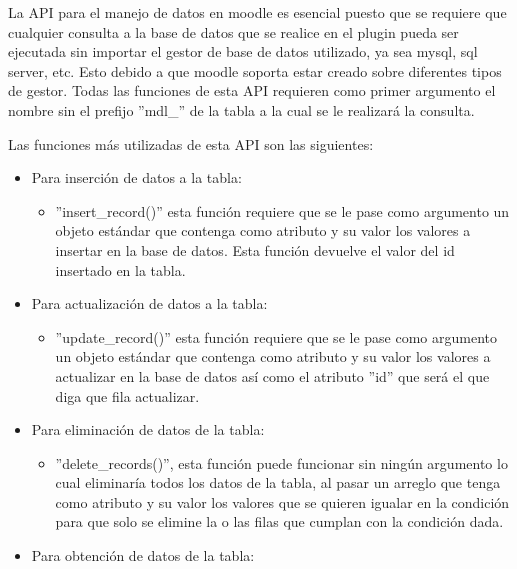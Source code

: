 		La API para el manejo de datos en moodle es esencial puesto que se requiere que cualquier consulta a la base de datos que se realice en el plugin pueda ser ejecutada sin importar el gestor de base de datos utilizado, ya sea mysql, sql server, etc. Esto debido a que moodle soporta estar creado sobre diferentes tipos de gestor.
		Todas las funciones de esta API requieren como primer argumento el nombre sin el prefijo ''mdl\_'' de la tabla a la cual se le realizará la consulta.

    Las funciones más utilizadas de esta API son las siguientes:

    \begin{itemize}
      \item Para inserción de datos a la tabla:

\begin{itemize}
  \item ''insert\_record()'' esta función requiere que se le pase como argumento un objeto estándar que contenga como atributo y su valor los valores a insertar en la base de datos. Esta función devuelve el valor del id insertado en la tabla.
\end{itemize}

      \item Para actualización de datos a la tabla:

      \begin{itemize}
        \item 	''update\_record()'' esta función requiere que se le pase como argumento un objeto estándar que contenga como atributo y su valor los valores a actualizar en la base de datos así como el atributo ''id'' que será el que diga que fila actualizar.
      \end{itemize}

      \item Para eliminación de datos de la tabla:

      \begin{itemize}
        \item ''delete\_records()'', esta función puede funcionar sin ningún argumento lo cual eliminaría todos los datos de la tabla, al pasar un arreglo que tenga como atributo y su valor los valores que se quieren igualar en la condición para que solo se elimine la o las filas que cumplan con la condición dada.
      \end{itemize}

      \item Para obtención de datos de la tabla:


\end{itemize}

